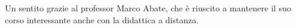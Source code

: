 Un sentito grazie al professor Marco Abate, che è riuscito a mantenere il suo corso interessante anche con la didattica a distanza.
